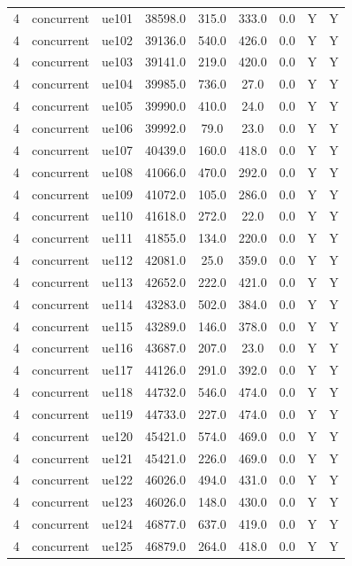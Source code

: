 \begin{table}[ht]
\begin{tabular}{|c|c|c|c|c|c|c|c|c|}
4 & concurrent & ue101 & 38598.0 & 315.0 & 333.0 & 0.0 & Y & Y \\
4 & concurrent & ue102 & 39136.0 & 540.0 & 426.0 & 0.0 & Y & Y \\
4 & concurrent & ue103 & 39141.0 & 219.0 & 420.0 & 0.0 & Y & Y \\
4 & concurrent & ue104 & 39985.0 & 736.0 & 27.0 & 0.0 & Y & Y \\
4 & concurrent & ue105 & 39990.0 & 410.0 & 24.0 & 0.0 & Y & Y \\
4 & concurrent & ue106 & 39992.0 & 79.0 & 23.0 & 0.0 & Y & Y \\
4 & concurrent & ue107 & 40439.0 & 160.0 & 418.0 & 0.0 & Y & Y \\
4 & concurrent & ue108 & 41066.0 & 470.0 & 292.0 & 0.0 & Y & Y \\
4 & concurrent & ue109 & 41072.0 & 105.0 & 286.0 & 0.0 & Y & Y \\
4 & concurrent & ue110 & 41618.0 & 272.0 & 22.0 & 0.0 & Y & Y \\
4 & concurrent & ue111 & 41855.0 & 134.0 & 220.0 & 0.0 & Y & Y \\
4 & concurrent & ue112 & 42081.0 & 25.0 & 359.0 & 0.0 & Y & Y \\
4 & concurrent & ue113 & 42652.0 & 222.0 & 421.0 & 0.0 & Y & Y \\
4 & concurrent & ue114 & 43283.0 & 502.0 & 384.0 & 0.0 & Y & Y \\
4 & concurrent & ue115 & 43289.0 & 146.0 & 378.0 & 0.0 & Y & Y \\
4 & concurrent & ue116 & 43687.0 & 207.0 & 23.0 & 0.0 & Y & Y \\
4 & concurrent & ue117 & 44126.0 & 291.0 & 392.0 & 0.0 & Y & Y \\
4 & concurrent & ue118 & 44732.0 & 546.0 & 474.0 & 0.0 & Y & Y \\
4 & concurrent & ue119 & 44733.0 & 227.0 & 474.0 & 0.0 & Y & Y \\
4 & concurrent & ue120 & 45421.0 & 574.0 & 469.0 & 0.0 & Y & Y \\
4 & concurrent & ue121 & 45421.0 & 226.0 & 469.0 & 0.0 & Y & Y \\
4 & concurrent & ue122 & 46026.0 & 494.0 & 431.0 & 0.0 & Y & Y \\
4 & concurrent & ue123 & 46026.0 & 148.0 & 430.0 & 0.0 & Y & Y \\
4 & concurrent & ue124 & 46877.0 & 637.0 & 419.0 & 0.0 & Y & Y \\
4 & concurrent & ue125 & 46879.0 & 264.0 & 418.0 & 0.0 & Y & Y \\

\end{tabular}
\end{table}
